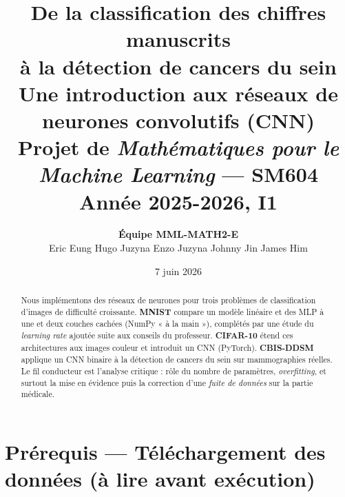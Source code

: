 \documentclass[11pt]{article}
\title{\vspace{-1.2cm}\textbf{De la classification des chiffres manuscrits\\
à la détection de cancers du sein}\\[2pt]
\large Une introduction aux réseaux de neurones convolutifs (CNN)\\[2pt]
\normalsize Projet de \emph{Mathématiques pour le Machine Learning} --- SM604\\
\normalsize Année 2025-2026, I1}
\author{\textbf{Équipe MML-MATH2-E}\\[2pt]
Eric Eung \quad Hugo Juzyna \quad Enzo Juzyna \quad Johnny Jin \quad James Him}
\date{7 juin 2026}
\begin{document}
\maketitle
\vspace{-0.6cm}

\begin{abstract}
\noindent Nous implémentons des réseaux de neurones pour trois problèmes de classification d'images
de difficulté croissante. \textbf{MNIST} compare un modèle linéaire et des MLP à une et deux couches
cachées (NumPy « à la main »), complétés par une étude du \emph{learning rate} ajoutée suite aux
conseils du professeur. \textbf{CIFAR-10} étend ces architectures aux images couleur et introduit un
CNN (PyTorch). \textbf{CBIS-DDSM} applique un CNN binaire à la détection de cancers du sein sur
mammographies réelles. Le fil conducteur est l'analyse critique : rôle du nombre de paramètres,
\emph{overfitting}, et surtout la mise en évidence puis la correction d'une \emph{fuite de données}
sur la partie médicale.
\end{abstract}

\section*{Prérequis --- Téléchargement des données (à lire avant exécution)}
\begin{center}
\end{center}

\vspace{-0.1cm}
\end{document}
